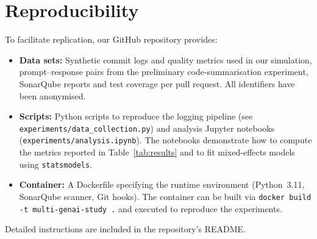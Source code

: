 \documentclass[conference]{IEEEtran}
\begin{document}
\appendix
\section{Reproducibility}
To facilitate replication, our GitHub repository provides:
\begin{itemize}
  \item \textbf{Data sets:} Synthetic commit logs and quality metrics used in our simulation, prompt–response pairs from the preliminary code‑summarisation experiment, SonarQube reports and test coverage per pull request.  All identifiers have been anonymised.
  \item \textbf{Scripts:} Python scripts to reproduce the logging pipeline (see \texttt{experiments/data\_collection.py}) and analysis Jupyter notebooks (\texttt{experiments/analysis.ipynb}).  The notebooks demonstrate how to compute the metrics reported in Table \ref{tab:results} and to fit mixed‑effects models using \texttt{statsmodels}.
  \item \textbf{Container:} A Dockerfile specifying the runtime environment (Python 3.11, SonarQube scanner, Git hooks).  The container can be built via \texttt{docker build -t multi-genai-study .} and executed to reproduce the experiments.
\end{itemize}
Detailed instructions are included in the repository’s README.
\end{document}
